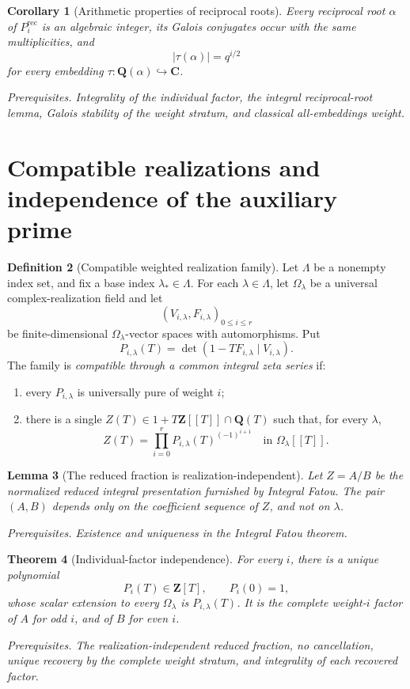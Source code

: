 \documentclass[10pt]{article}
\newtheorem{theorem}{Theorem}[section]
\newtheorem{corollary}[theorem]{Corollary}
\newtheorem{lemma}[theorem]{Lemma}
\theoremstyle{definition}
\newtheorem{definition}[theorem]{Definition}
\newcommand{\deps}[1]{\par\smallskip\noindent\textit{Prerequisites.} #1}
\begin{document}
\begin{corollary}[Arithmetic properties of reciprocal roots]
Every reciprocal root \(\alpha\) of \(P_i^{\mathrm{rec}}\) is an algebraic
integer, its Galois conjugates occur with the same multiplicities, and
\[
 |\tau(\alpha)|=q^{i/2}
\]
for every embedding \(\tau:\mathbf Q(\alpha)\hookrightarrow\mathbf C\).
\deps{Integrality of the individual factor, the integral reciprocal-root
lemma, Galois stability of the weight stratum, and classical
all-embeddings weight.}
\end{corollary}

\section{Compatible realizations and independence of the auxiliary prime}

\begin{definition}[Compatible weighted realization family]
Let \(\Lambda\) be a nonempty index set, and fix a base index
\(\lambda_*\in\Lambda\).  For each \(\lambda\in\Lambda\), let
\(\Omega_\lambda\) be a universal complex-realization field and let
\[
 (V_{i,\lambda},F_{i,\lambda})_{0\leq i\leq r}
\]
be finite-dimensional \(\Omega_\lambda\)-vector spaces with automorphisms.
Put
\[
 P_{i,\lambda}(T)
 =\det(1-TF_{i,\lambda}\mid V_{i,\lambda}).
\]
The family is \emph{compatible through a common integral zeta series} if:
\begin{enumerate}[label=\textup{(\roman*)}]
\item every \(P_{i,\lambda}\) is universally pure of weight \(i\);
\item there is a single
\(Z(T)\in1+T\mathbf Z[[T]]\cap\mathbf Q(T)\) such that, for every
\(\lambda\),
\[
 Z(T)=\prod_{i=0}^{r}
 P_{i,\lambda}(T)^{(-1)^{i+1}}
 \quad\text{in }\Omega_\lambda[[T]].
\]
\end{enumerate}
\end{definition}

\begin{lemma}[The reduced fraction is realization-independent]
Let \(Z=A/B\) be the normalized reduced integral presentation furnished by
Integral Fatou.  The pair \((A,B)\) depends only on the coefficient sequence
of \(Z\), and not on \(\lambda\).
\deps{Existence and uniqueness in the Integral Fatou theorem.}
\end{lemma}

\begin{theorem}[Individual-factor independence]
For every \(i\), there is a unique polynomial
\[
 P_i(T)\in\mathbf Z[T],\qquad P_i(0)=1,
\]
whose scalar extension to every \(\Omega_\lambda\) is
\(P_{i,\lambda}(T)\).  It is the complete weight-\(i\) factor of \(A\) for
odd \(i\), and of \(B\) for even \(i\).
\deps{The realization-independent reduced fraction, no cancellation,
unique recovery by the complete weight stratum, and integrality of each
recovered factor.}
\end{theorem}
\end{document}
